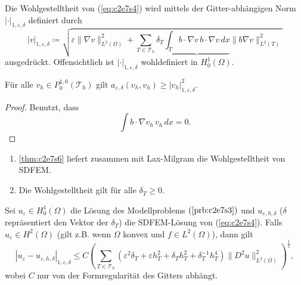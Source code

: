 \documentclass[../skript.tex]{subfiles}
\begin{document}
Die Wohlgestelltheit von (\ref{eq:c2e7s4}) wird mittels der Gitter-abhängigen Norm $|\cdot|_{1,\varepsilon,\delta}$ definiert durch
\[
	|v|_{1,\varepsilon,\delta} \coloneqq \sqrt{ \varepsilon\|\nabla v\|_{L^2(\Omega)}^2 + \sum_{T\in\mathcal{T}_h} \delta_T \underbrace{\int_T b\cdot\nabla v\,b\cdot\nabla v\,dx}{\|b\nabla v\|_{L^2(T)}^2}}
\]
ausgedrückt. Offensichtlich ist $|\cdot|_{1,\varepsilon,\delta}$ wohldefiniert in $H^1_0(\Omega)$.
\begin{theorem}\label{thm:c2e7s6}
	Für alle $v_h\in P^{1,0}_0(\mathcal{T}_h)$ gilt $a_{\varepsilon,\delta}(v_h,v_h)\geq |v_h|_{1,\varepsilon,\delta}^2$.
\end{theorem} 
\begin{proof}
	Benutzt, dass 
	\[
		\int b\cdot\nabla v_h\,v_h\,dx = 0.
	\]
\end{proof}
\begin{remark}\label{rem:c2e7s7}
	\begin{enumerate}
		\item \cref{thm:c2e7s6} liefert zusammen mit Lax-Milgram die Wohlgestelltheit von SDFEM.
		\item Die Wohlgestelltheit gilt für alle $\delta_T\geq 0$.
	\end{enumerate}
\end{remark}
\begin{theorem}\label{thm:c2e7s8}
	Sei $u_\varepsilon\in H^1_0(\Omega)$ die Lösung des Modellproblems $(\ref{prb:c2e7s3})$ und $u_{\varepsilon,h,\delta}$ ($\delta$ repräsentiert den Vektor der $\delta_T$) die SDFEM-Lösung von (\ref{eq:c2e7s4}). Falls $u_\varepsilon\in H^2(\Omega)$ (gilt z.B. wenn $\Omega$ konvex und $f\in L^2(\Omega)$), dann gilt 
	\[
		|u_\varepsilon-u_{\varepsilon,h,\delta}|_{1,\varepsilon,\delta} \leq C\left( \sum_{T\in\mathcal{T}_h} (\varepsilon^2\delta_T + \varepsilon h_T^2+\delta_T h_T^2 + \delta_T^{-1}h_T^4 ) \|D^2u\|_{L^2(\Omega)}^2\right)^{\frac{1}{2}},
	\]
	wobei $C$ nur von der Formregularität des Gitters abhängt. 
\end{theorem}
\end{document}
